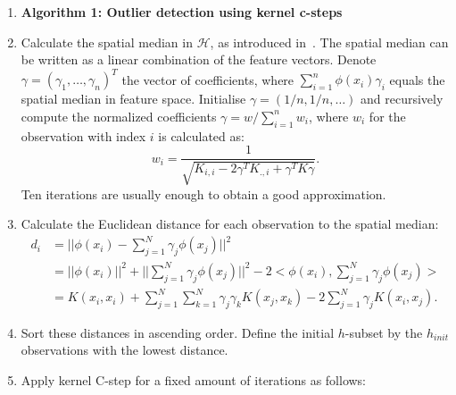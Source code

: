 \documentclass[preprint,12pt]{elsarticle}
\begin{document}
	\begin{enumerate}
		\item[]\textbf{Algorithm 1: Outlier detection using kernel c-steps}
		\item Calculate the spatial median in $\mathcal{H}$, as introduced in~\cite{debruyne2010detecting}. The spatial median can be written as a linear combination of the feature vectors. Denote $\gamma = (\gamma_1, \dots, \gamma_n)^T$ the vector of coefficients, where  $\sum_{i=1}^{n} \phi(x_i) \gamma_i$ equals the spatial median in feature space. Initialise $\gamma = (1/n, 1/n, \dots)$ and recursively compute the normalized coefficients $\gamma = w / \sum_{i=1}^{n}w_i$, where $w_i$ for the observation with index $i$ is calculated as:
		\begin{equation}
		w_i = \frac{1}{\sqrt{ K_{i,i} - 2 \gamma^T K_{., i} + \gamma^T K \gamma}}.
		\end{equation}
		Ten iterations are usually enough to obtain a good approximation.	
		\item  Calculate the Euclidean distance for each observation to the spatial median:
		\begin{align}
		d_i &= || \phi(x_i) - \sum_{j=1}^N \gamma_j \phi(x_j)||^2 \\
		&= || \phi(x_i)||^2 + || \sum_{j=1}^N \gamma_j \phi(x_j)||^2 - 2 <\phi(x_i),\sum_{j=1}^N \gamma_j \phi(x_j)> \\
		&= K(x_i,x_i) + \sum_{j=1}^N \sum_{k=1}^N \gamma_j \gamma_k K(x_j,x_k) - 2 \sum_{j=1}^N\gamma_j K(x_i,x_j).
		\end{align}
		\item 	Sort these distances in ascending order. Define the initial $h$-subset by the $h_{init}$ observations with the lowest distance.	
		
		\item Apply kernel C-step for a fixed amount of iterations as follows:
		

\end{enumerate}
\end{document}
